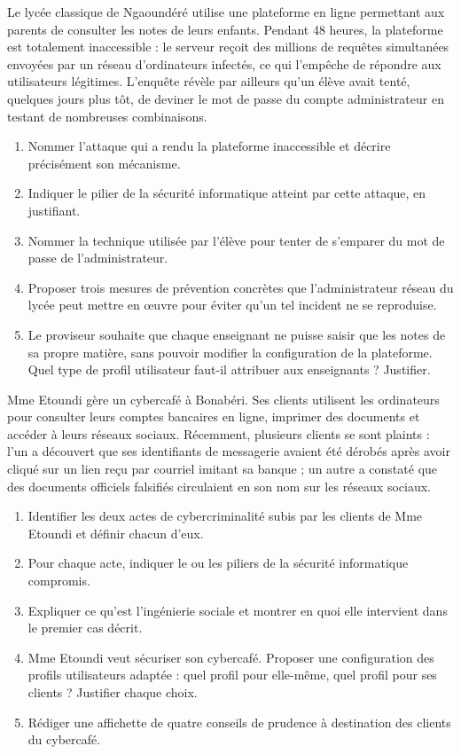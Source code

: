 \documentclass[11pt]{article}
\begin{document}
\begin{exercice}
Le lycée classique de Ngaoundéré utilise une plateforme en ligne permettant aux parents de consulter les notes de leurs enfants. Pendant 48 heures, la plateforme est totalement inaccessible : le serveur reçoit des millions de requêtes simultanées envoyées par un réseau d'ordinateurs infectés, ce qui l'empêche de répondre aux utilisateurs légitimes. L'enquête révèle par ailleurs qu'un élève avait tenté, quelques jours plus tôt, de deviner le mot de passe du compte administrateur en testant de nombreuses combinaisons.
\begin{enumerate}
\item Nommer l'attaque qui a rendu la plateforme inaccessible et décrire précisément son mécanisme.
\item Indiquer le pilier de la sécurité informatique atteint par cette attaque, en justifiant.
\item Nommer la technique utilisée par l'élève pour tenter de s'emparer du mot de passe de l'administrateur.
\item Proposer trois mesures de prévention concrètes que l'administrateur réseau du lycée peut mettre en œuvre pour éviter qu'un tel incident ne se reproduise.
\item Le proviseur souhaite que chaque enseignant ne puisse saisir que les notes de sa propre matière, sans pouvoir modifier la configuration de la plateforme. Quel type de profil utilisateur faut-il attribuer aux enseignants ? Justifier.
\end{enumerate}
\end{exercice}

\begin{exercice}
Mme Etoundi gère un cybercafé à Bonabéri. Ses clients utilisent les ordinateurs pour consulter leurs comptes bancaires en ligne, imprimer des documents et accéder à leurs réseaux sociaux. Récemment, plusieurs clients se sont plaints : l'un a découvert que ses identifiants de messagerie avaient été dérobés après avoir cliqué sur un lien reçu par courriel imitant sa banque ; un autre a constaté que des documents officiels falsifiés circulaient en son nom sur les réseaux sociaux.
\begin{enumerate}
\item Identifier les deux actes de cybercriminalité subis par les clients de Mme Etoundi et définir chacun d'eux.
\item Pour chaque acte, indiquer le ou les piliers de la sécurité informatique compromis.
\item Expliquer ce qu'est l'ingénierie sociale et montrer en quoi elle intervient dans le premier cas décrit.
\item Mme Etoundi veut sécuriser son cybercafé. Proposer une configuration des profils utilisateurs adaptée : quel profil pour elle-même, quel profil pour ses clients ? Justifier chaque choix.
\item Rédiger une affichette de quatre conseils de prudence à destination des clients du cybercafé.
\end{enumerate}
\end{exercice}
\end{document}
